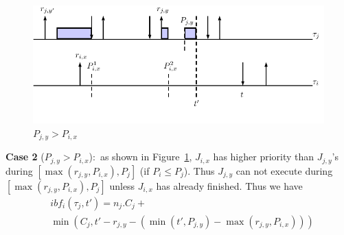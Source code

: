 \begin{figure}[h!]
 \centering
\includegraphics[scale=0.7]{Figure/C2}  
\caption{$P_{j,y}> P_{i,x}$}
  \label{fig:case2}
\end{figure}

\textbf{Case 2} ($P_{j,y}> P_{i,x}$):~as shown in  Figure~\ref{fig:case2}, $J_{i,x}$ has higher priority than $J_{j,y}$'s  during $[\max(r_{j,y},P_{i,x}),P_j]$ (if $P_i\leq P_j$). Thus  $J_{j,y}$ can not execute  during $[\max(r_{j,y},P_{i,x}),P_j]$ unless $J_{i,x}$ has already finished. Thus we have
	\begin{align*}
		&ibf_i(\tau_j,t')=n_j.C_j +
\\&\min\left(C_j,\!t'\!-\!r_{j,y}\!-\!\left(\min(t'\!,\!P_{j,y})\!-\!\max(r_{j,y},\!P_{i,x})\right)\right)
		\end{align*}

